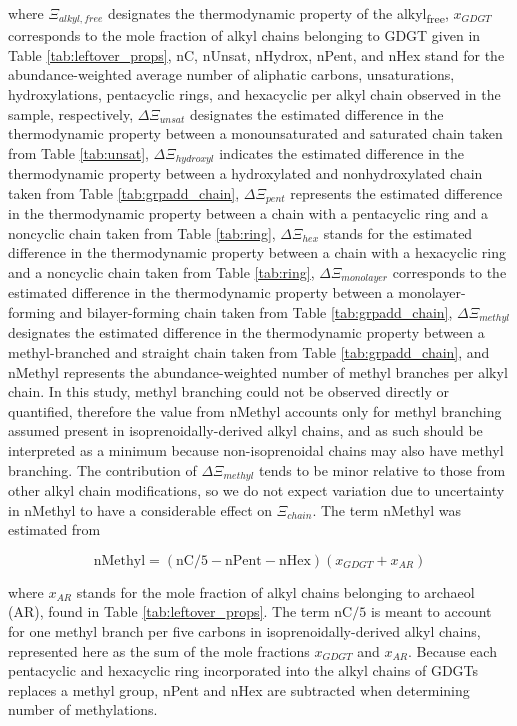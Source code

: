 \noindent where $\Xi_{alkyl, free}$ designates the thermodynamic property of the alkyl\textsubscript{free}, $x_{GDGT}$ corresponds to the mole fraction of alkyl chains belonging to GDGT given in Table \ref{tab:leftover_props},  nC, nUnsat, nHydrox, nPent, and nHex stand for the abundance-weighted average number of aliphatic carbons, unsaturations, hydroxylations, pentacyclic rings, and hexacyclic per alkyl chain observed in the sample, respectively, $\Delta\Xi_{unsat}$ designates the estimated difference in the thermodynamic property between a monounsaturated and saturated chain taken from Table \ref{tab:unsat}, $\Delta\Xi_{hydroxyl}$ indicates the estimated difference in the thermodynamic property between a hydroxylated and nonhydroxylated chain taken from Table \ref{tab:grpadd_chain}, $\Delta\Xi_{pent}$ represents the estimated difference in the thermodynamic property between a chain with a pentacyclic ring and a noncyclic chain taken from Table \ref{tab:ring}, $\Delta\Xi_{hex}$ stands for the estimated difference in the thermodynamic property between a chain with a hexacyclic ring and a noncyclic chain taken from Table \ref{tab:ring}, $\Delta\Xi_{monolayer}$ corresponds to the estimated difference in the thermodynamic property between a monolayer-forming and bilayer-forming chain taken from Table \ref{tab:grpadd_chain}, $\Delta\Xi_{methyl}$ designates the estimated difference in the thermodynamic property between a methyl-branched and straight chain taken from Table \ref{tab:grpadd_chain}, and nMethyl represents the abundance-weighted number of methyl branches per alkyl chain. In this study, methyl branching could not be observed directly or quantified, therefore the value from nMethyl accounts only for methyl branching assumed present in isoprenoidally-derived alkyl chains, and as such should be interpreted as a minimum because non-isoprenoidal chains may also have methyl branching. The contribution of $\Delta\Xi_{methyl}$ tends to be minor relative to those from other alkyl chain modifications, so we do not expect variation due to uncertainty in nMethyl to have a considerable effect on $\Xi_{chain}$. The term nMethyl was estimated from

\begin{equation}
\text{nMethyl} = (\text{nC}/5 - \text{nPent} - \text{nHex})(x_{GDGT} + x_{AR})
\end{equation}

\noindent where $x_{AR}$ stands for the mole fraction of alkyl chains belonging to archaeol (AR), found in Table \ref{tab:leftover_props}. The term nC$/5$ is meant to account for one methyl branch per five carbons in isoprenoidally-derived alkyl chains, represented here as the sum of the mole fractions $x_{GDGT}$ and $x_{AR}$. Because each pentacyclic and hexacyclic ring incorporated into the alkyl chains of GDGTs replaces a methyl group, nPent and nHex are subtracted when determining number of methylations.



